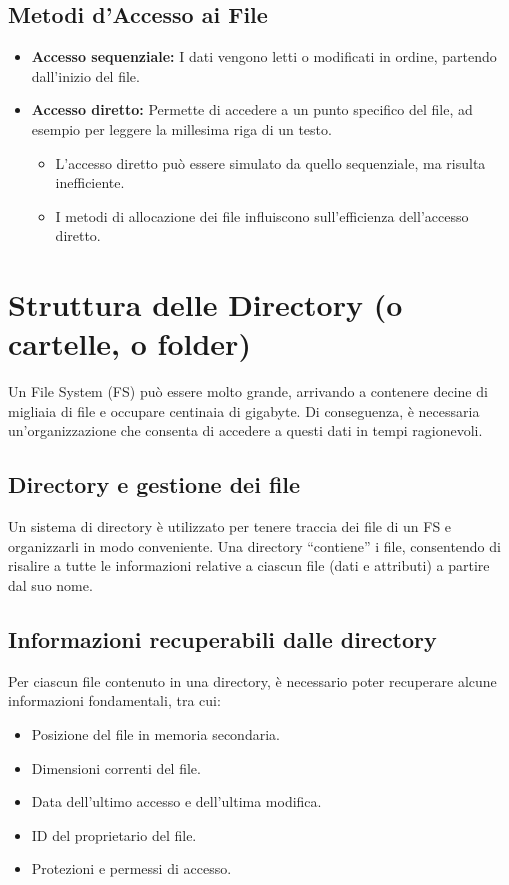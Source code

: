 \subsection{Metodi d’Accesso ai File}

\begin{itemize}
    \item \textbf{Accesso sequenziale:} I dati vengono letti o modificati in ordine, partendo dall’inizio del file.
    \item \textbf{Accesso diretto:} Permette di accedere a un punto specifico del file, ad esempio per leggere la millesima riga di un testo.
    \begin{itemize}
        \item L'accesso diretto può essere simulato da quello sequenziale, ma risulta inefficiente.
        \item I metodi di allocazione dei file influiscono sull'efficienza dell'accesso diretto.
    \end{itemize}
\end{itemize}

\section{Struttura delle Directory (o cartelle, o folder)}

Un File System (FS) può essere molto grande, arrivando a contenere decine di migliaia di file e occupare centinaia di gigabyte. Di conseguenza, è necessaria un'organizzazione che consenta di accedere a questi dati in tempi ragionevoli.


\subsection{Directory e gestione dei file}
Un sistema di directory è utilizzato per tenere traccia dei file di un FS e organizzarli in modo conveniente. Una directory “contiene” i file, consentendo di risalire a tutte le informazioni relative a ciascun file (dati e attributi) a partire dal suo nome.

\subsection{Informazioni recuperabili dalle directory}
Per ciascun file contenuto in una directory, è necessario poter recuperare alcune informazioni fondamentali, tra cui:
\begin{itemize}
    \item Posizione del file in memoria secondaria.
    \item Dimensioni correnti del file.
    \item Data dell’ultimo accesso e dell’ultima modifica.
    \item ID del proprietario del file.
    \item Protezioni e permessi di accesso.
\end{itemize}

